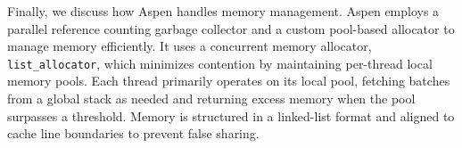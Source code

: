 Finally, we discuss how Aspen handles memory management. Aspen employs a parallel reference counting garbage collector and a custom pool-based allocator to manage memory efficiently. It uses a concurrent memory allocator, \texttt{list\_allocator}, which minimizes contention by maintaining per-thread local memory pools. Each thread primarily operates on its local pool, fetching batches from a global stack as needed and returning excess memory when the pool surpasses a threshold. Memory is structured in a linked-list format and aligned to cache line boundaries to prevent false sharing.








